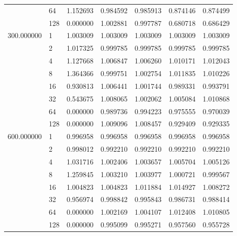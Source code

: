 \begin{tabular}{llrrrrr}
 & 64 & 1.152693 & 0.984592 & 0.985913 & 0.874146 & 0.874499 \\
 & 128 & 0.000000 & 1.002881 & 0.997787 & 0.680718 & 0.686429 \\
\multirow[c]{8}{*}{300.000000} & 1 & 1.003009 & 1.003009 & 1.003009 & 1.003009 & 1.003009 \\
 & 2 & 1.017325 & 0.999785 & 0.999785 & 0.999785 & 0.999785 \\
 & 4 & 1.127668 & 1.006847 & 1.006260 & 1.010171 & 1.012043 \\
 & 8 & 1.364366 & 0.999751 & 1.002754 & 1.011835 & 1.010226 \\
 & 16 & 0.930813 & 1.006441 & 1.001744 & 0.989331 & 0.993791 \\
 & 32 & 0.543675 & 1.008065 & 1.002062 & 1.005084 & 1.010868 \\
 & 64 & 0.000000 & 0.989736 & 0.994223 & 0.975555 & 0.970039 \\
 & 128 & 0.000000 & 1.009096 & 1.008457 & 0.929409 & 0.929335 \\
\multirow[c]{8}{*}{600.000000} & 1 & 0.996958 & 0.996958 & 0.996958 & 0.996958 & 0.996958 \\
 & 2 & 0.998012 & 0.992210 & 0.992210 & 0.992210 & 0.992210 \\
 & 4 & 1.031716 & 1.002406 & 1.003657 & 1.005704 & 1.005126 \\
 & 8 & 1.259845 & 1.003210 & 1.003977 & 1.000721 & 0.999567 \\
 & 16 & 1.004823 & 1.004823 & 1.011884 & 1.014927 & 1.008272 \\
 & 32 & 0.956974 & 0.998842 & 0.995843 & 0.986731 & 0.988414 \\
 & 64 & 0.000000 & 1.002169 & 1.004107 & 1.012408 & 1.010805 \\
 & 128 & 0.000000 & 0.995099 & 0.995271 & 0.957560 & 0.955728 \\
\end{tabular}
